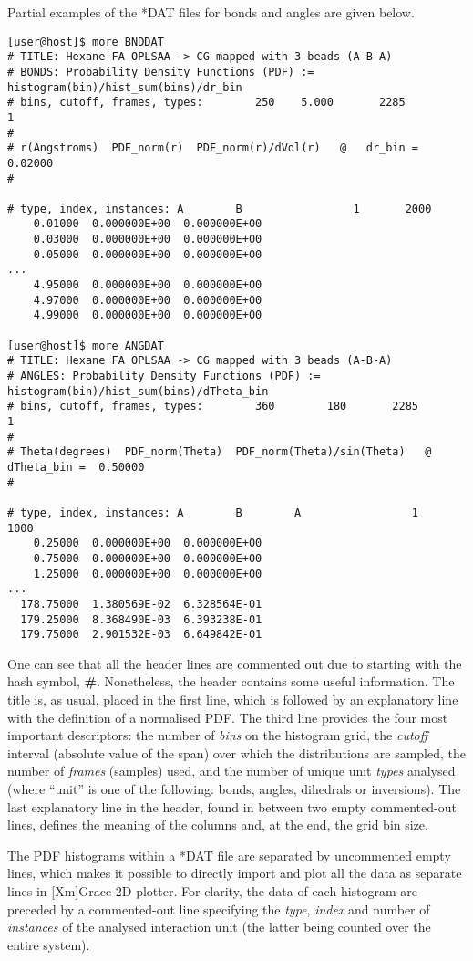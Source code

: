 Partial examples of the *DAT files for bonds and angles are given below.

\begin{lstlisting}
[user@host]$ more BNDDAT
# TITLE: Hexane FA OPLSAA -> CG mapped with 3 beads (A-B-A)
# BONDS: Probability Density Functions (PDF) := histogram(bin)/hist_sum(bins)/dr_bin
# bins, cutoff, frames, types:        250    5.000       2285          1
#
# r(Angstroms)  PDF_norm(r)  PDF_norm(r)/dVol(r)   @   dr_bin =  0.02000
#

# type, index, instances: A        B                 1       2000
    0.01000  0.000000E+00  0.000000E+00
    0.03000  0.000000E+00  0.000000E+00
    0.05000  0.000000E+00  0.000000E+00
...
    4.95000  0.000000E+00  0.000000E+00
    4.97000  0.000000E+00  0.000000E+00
    4.99000  0.000000E+00  0.000000E+00

[user@host]$ more ANGDAT
# TITLE: Hexane FA OPLSAA -> CG mapped with 3 beads (A-B-A)
# ANGLES: Probability Density Functions (PDF) := histogram(bin)/hist_sum(bins)/dTheta_bin
# bins, cutoff, frames, types:        360        180       2285          1
#
# Theta(degrees)  PDF_norm(Theta)  PDF_norm(Theta)/sin(Theta)   @   dTheta_bin =  0.50000
#

# type, index, instances: A        B        A                 1       1000
    0.25000  0.000000E+00  0.000000E+00
    0.75000  0.000000E+00  0.000000E+00
    1.25000  0.000000E+00  0.000000E+00
...
  178.75000  1.380569E-02  6.328564E-01
  179.25000  8.368490E-03  6.393238E-01
  179.75000  2.901532E-03  6.649842E-01
\end{lstlisting}

One can see that all the header lines are commented out due
to starting with the hash symbol, {\bf \#}.  Nonetheless, the
header contains some useful information.  The title is, as usual,
placed in the first line, which is followed by an explanatory
line with the definition of a normalised PDF.
The third line provides the four most important descriptors:
the number of {\em bins} on the histogram grid, the {\em cutoff}
interval (absolute value of the span) over which the distributions
are sampled, the number of {\em frames} (samples) used, and
the number of unique unit {\em types} analysed (where ``unit''
is one of the following: bonds, angles, dihedrals or inversions).
The last explanatory line in the header, found in between
two empty commented-out lines, defines the meaning of
the columns and, at the end, the grid bin size.

The PDF histograms within a *DAT file are separated by uncommented
empty lines, which makes it possible to directly import and plot
all the data as separate lines in [Xm]Grace 2D plotter.  For clarity,
the data of each histogram are preceded by a commented-out line
specifying the {\em type}, {\em index} and number of {\em instances}
of the analysed interaction unit (the latter being counted over
the entire system).

